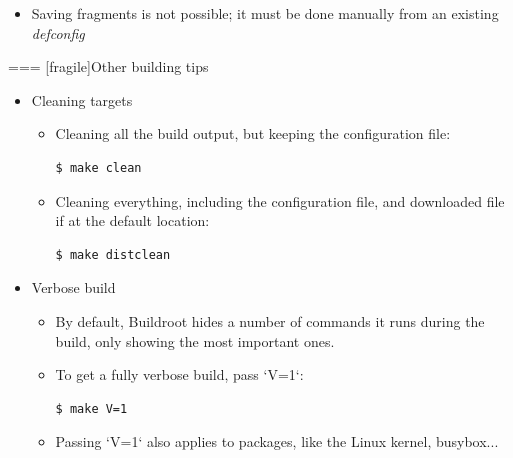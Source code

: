   \begin{itemize}
  \item Saving fragments is not possible; it must be done manually
    from an existing {\em defconfig}
  \end{itemize}



=== [fragile]{Other building tips}
  \begin{itemize}
  \item Cleaning targets
    \begin{itemize}
    \item Cleaning all the build output, but keeping the configuration
      file:
      \begin{block}{}
\begin{verbatim}
$ make clean
\end{verbatim}
      \end{block}
    \item Cleaning everything, including the configuration file, and
      downloaded file if at the default location:
      \begin{block}{}
\begin{verbatim}
$ make distclean
\end{verbatim}
      \end{block}
    \end{itemize}
  \item Verbose build
    \begin{itemize}
    \item By default, Buildroot hides a number of commands it runs
      during the build, only showing the most important ones.
    \item To get a fully verbose build, pass `V=1`:
      \begin{block}{}
\begin{verbatim}
$ make V=1
\end{verbatim}
      \end{block}
    \item Passing `V=1` also applies to packages, like the Linux
      kernel, busybox...
    \end{itemize}
  \end{itemize}

